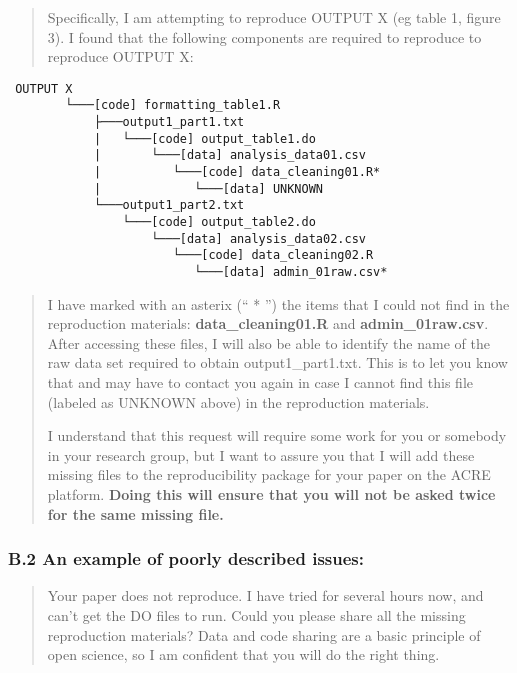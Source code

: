 \documentclass[]{book}
\begin{document}
\begin{quote}
Specifically, I am attempting to reproduce OUTPUT X (eg table 1, figure 3). I found that the following components are required to reproduce to reproduce OUTPUT X:
\end{quote}

\begin{verbatim}
 OUTPUT X
        └───[code] formatting_table1.R
            ├───output1_part1.txt  
            |   └───[code] output_table1.do           
            |       └───[data] analysis_data01.csv
            |          └───[code] data_cleaning01.R*
            |             └───[data] UNKNOWN
            └───output1_part2.txt  
                └───[code] output_table2.do           
                    └───[data] analysis_data02.csv
                       └───[code] data_cleaning02.R
                          └───[data] admin_01raw.csv* 
\end{verbatim}

\begin{quote}
I have marked with an asterix (`` * '') the items that I could not find in the reproduction materials: \textbf{data\_cleaning01.R} and \textbf{admin\_01raw.csv}. After accessing these files, I will also be able to identify the name of the raw data set required to obtain output1\_part1.txt. This is to let you know that and may have to contact you again in case I cannot find this file (labeled as UNKNOWN above) in the reproduction materials.

I understand that this request will require some work for you or somebody in your research group, but I want to assure you that I will add these missing files to the reproducibility package for your paper on the ACRE platform. \textbf{Doing this will ensure that you will not be asked twice for the same missing file.}
\end{quote}

\hypertarget{b.2-an-example-of-poorly-described-issues}{%
\subsubsection{B.2 An example of poorly described issues:}\label{b.2-an-example-of-poorly-described-issues}}

\begin{quote}
Your paper does not reproduce. I have tried for several hours now, and can't get the DO files to run. Could you please share all the missing reproduction materials? Data and code sharing are a basic principle of open science, so I am confident that you will do the right thing.
\end{quote}
\end{document}

